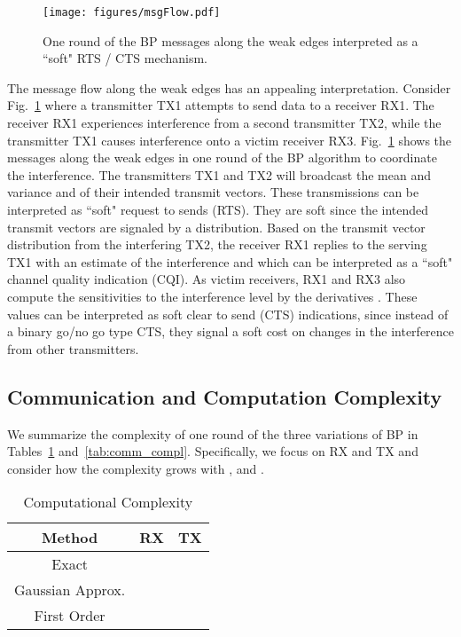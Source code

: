 \documentclass[letterpaper,twocolumn,twoside]{IEEEtran}
\begin{document}
\begin{figure}
\begin{center}
\texttt{[image: figures/msgFlow.pdf]}
\end{center}
\caption{One round of the BP messages along the weak edges
interpreted as a ``soft" RTS / CTS mechanism.
}
\label{fig:bpMsgFlow}
\end{figure}

The message flow along the weak edges has an appealing
interpretation. Consider Fig.\ \ref{fig:bpMsgFlow} where a
transmitter TX1 attempts to send data to a receiver RX1.  The
receiver RX1 experiences interference from a second transmitter TX2,
while the transmitter TX1 causes interference onto a victim receiver
RX3.  Fig.\ \ref{fig:bpMsgFlow} shows the messages along the weak
edges in one round of the BP algorithm to coordinate the
interference. The transmitters TX1 and TX2 will broadcast the mean
and variance  and  of their intended
transmit vectors. These transmissions can be interpreted as ``soft"
request to sends (RTS).  They are soft since the intended transmit
vectors are signaled by a distribution.  Based on the transmit
vector distribution from the interfering TX2, the
 receiver RX1 replies to the serving TX1 with an estimate of the interference
  and  which can be interpreted
as a ``soft" channel
quality indication (CQI).  As victim receivers, RX1 and RX3 also compute
the sensitivities to the interference level by the derivatives .
These values can be interpreted as soft clear to send (CTS) indications,
since instead of a binary go/no go type CTS, they signal a soft cost
on changes in the interference from other transmitters.
\subsection{Communication and Computation Complexity}
We summarize the complexity of one round of the three variations of
BP in Tables~\ref{tab:comp_compl} and~\ref{tab:comm_compl}.
Specifically, we focus on RX  and TX  and consider how the
complexity grows with ,  and .

\begin{table}
\begin{center}
\begin{tabular}{|c|c|c|}
 \hline   Method & RX  & TX  \\
\hline Exact & &   \\
\hline Gaussian Approx. &  & \\
\hline First Order & & \\
\hline
\end{tabular}
\end{center}
\caption{Computational Complexity}
\label{tab:comp_compl}
\end{table}
\end{document}
